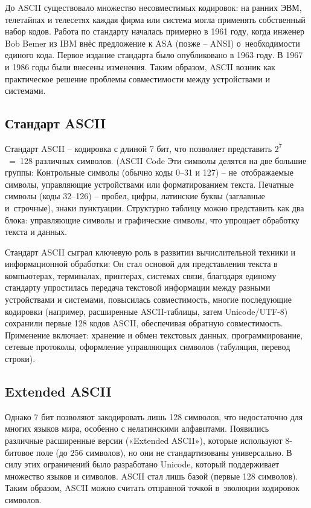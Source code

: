 \documentclass{ou}
\begin{document}
До ASCII существовало множество несовместимых кодировок: на ранних ЭВМ, телетайпах и теле­сетях каждая фирма или система могла применять собственный набор кодов. Работа по стандарту началась примерно в 1961 году, когда инженер Bob Bemer из IBM внёс предложение к ASA (позже -- ANSI) о~необходимости единого кода. Первое издание стандарта было опубликовано в 1963 году. В 1967 и 1986 годы были внесены изменения. Таким образом, ASCII возник как практическое решение проблемы совместимости между устройствами и системами.
\subsection{Стандарт ASCII}
Стандарт ASCII -- кодировка с длиной 7 бит, что позволяет представить $2^7$~=~128 различных символов. (ASCII Code Эти символы делятся на две большие группы: Контрольные символы (обычно коды 0--31 и 127) -- не~отображаемые символы, управляющие устройствами или форматированием текста.  Печатные символы (коды 32--126) -- пробел, цифры, латинские буквы (заглавные и~строчные), знаки пунктуации. Структурно таблицу можно представить как два блока: управляющие символы и графические символы, что упрощает обработку текста и данных.

Стандарт ASCII сыграл ключевую роль в развитии вычислительной техники и информационной обработки: Он стал основой для представления текста в компьютерах, терминалах, принтерах, системах связи, благодаря единому стандарту упростилась передача текстовой информации между разными устройствами и системами, повысилась совместимость, многие последующие кодировки (например, расширенные ASCII-таблицы, затем Unicode/UTF-8) сохранили первые 128 кодов ASCII, обеспечивая обратную совместимость. Применение включает: хранение и обмен текстовых данных, программирование, сетевые протоколы, оформление управляющих символов (табуляция, перевод строки).
\subsection{Extended ASCII}
Однако 7 бит позволяют закодировать лишь 128 символов, что недостаточно для многих языков мира, особенно с нелатинскими алфавитами. Появились различные расширенные версии («Extended ASCII»), которые используют 8-битовое поле (до 256 символов), но они не стандартизованы универсально. В силу этих ограничений было разработано Unicode, который поддерживает множество языков и символов. ASCII стал лишь базой (первые 128 символов). Таким образом, ASCII можно считать отправной точкой в~эволюции кодировок символов.
\end{document}
